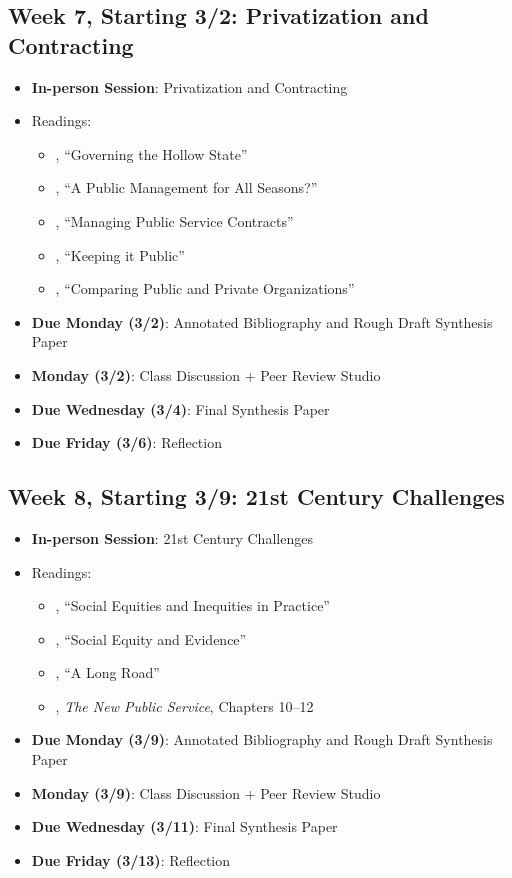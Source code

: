 \documentclass[11pt]{article}     %
\begin{document}
\subsection*{Week 7, Starting 3/2: Privatization and Contracting}
\begin{itemize}
    \item \textbf{In-person Session}: Privatization and Contracting
    \item Readings:
        \begin{itemize}
            \item \citet{MILWARD2000a}, ``Governing the Hollow State''
            \item \cite{hood1991}, ``A Public Management for All Seasons?''
            \item \citet{brownManagingPublicService2006}, ``Managing Public Service Contracts''
            \item \citet{jos2009}, ``Keeping it Public''
            \item \citet{RAINEY2000a}, ``Comparing Public and Private Organizations''
        \end{itemize}
    \item \textbf{Due Monday (3/2)}: Annotated Bibliography and Rough Draft Synthesis Paper
    \item \textbf{Monday (3/2)}: Class Discussion + Peer Review Studio
    \item \textbf{Due Wednesday (3/4)}: Final Synthesis Paper
    \item \textbf{Due Friday (3/6)}: Reflection
\end{itemize}

\subsection*{Week 8, Starting 3/9: 21st Century Challenges}
\begin{itemize}
    \item \textbf{In-person Session}: 21st Century Challenges
    \item Readings:
        \begin{itemize}
            \item \citet{maynard-moody2012}, ``Social Equities and Inequities in Practice''
            \item \citet{GOODEN2017}, ``Social Equity and Evidence''
            \item \citet{mccandless2022}, ``A Long Road''
            \item \citet{Denhardt2015}, \emph{The New Public Service}, Chapters 10--12
        \end{itemize}
    \item \textbf{Due Monday (3/9)}: Annotated Bibliography and Rough Draft Synthesis Paper
    \item \textbf{Monday (3/9)}: Class Discussion + Peer Review Studio
    \item \textbf{Due Wednesday (3/11)}: Final Synthesis Paper
    \item \textbf{Due Friday (3/13)}: Reflection
\end{itemize}
\end{document}
